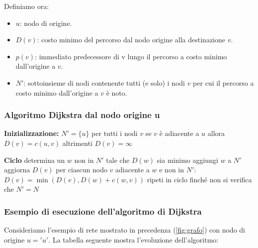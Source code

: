 Definiamo ora:
\begin{itemize}
  \item $u$: nodo di origine.
  \item $D(v)$: costo minimo del percorso dal nodo origine alla destinazione $v$. 
  \item $p(v)$: immediato predecessore di v lungo il percorso a costo minimo dall'origine a $v$. 
  \item $N'$: sottoinsieme di nodi contenente tutti (e solo) i nodi $v$ per cui il percorso a costo minimo dall'origine a $v$ è noto. 
\end{itemize}

\subsubsection*{Algoritmo Dijkstra dal nodo origine u}
\begin{algorithm}[H]
\caption{Algoritmo Dijkstra dal nodo origine u}
\begin{algorithmic}[1]
\STATE \textbf{Inizializzazione:}
\STATE \hspace{0.5cm}$N' = \{u\}$
\STATE \hspace{0.5cm}per tutti i nodi $v$
\STATE \hspace{1cm}se $v$ è adiacente a $u$
\STATE \hspace{1.5cm}allora $D(v) = c(u,v)$
\STATE \hspace{1cm}altrimenti $D(v) = \infty$

\STATE \textbf{Ciclo}
\STATE \hspace{0.5cm}determina un $w$ non in $N'$ tale che $D(w)$ sia minimo
\STATE \hspace{0.5cm}aggiungi $w$ a $N'$
\STATE \hspace{0.5cm}aggiorna $D(v)$ per ciascun nodo $v$ adiacente a $w$ e non in $N'$:
\STATE \hspace{1cm}$D(v) = \min(D(v), D(w) + c(w,v))$
\STATE \hspace{1cm}
\STATE \hspace{1cm}
\STATE \hspace{0.5cm}ripeti in ciclo finché non si verifica che $N' = N$
\end{algorithmic}
\end{algorithm}

\subsubsection*{Esempio di esecuzione dell'algoritmo di Dijkstra}
Consideriamo l'esempio di rete mostrato in precedenza (\ref{fig:grafo}) con nodo di origine \(u = 'u'\). La tabella seguente mostra l'evoluzione dell'algoritmo:

